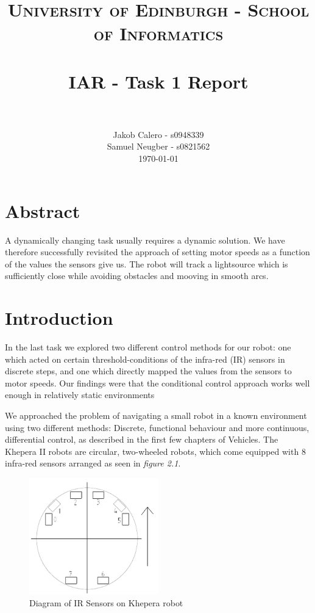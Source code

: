 \documentclass[paper=a4, fontsize=12pt]{scrartcl}	%
\title{
\vspace{-1in} 	
\usefont{OT1}{bch}{b}{n}
\normalfont \normalsize \textsc{University of Edinburgh - School of Informatics}
\\ [25pt]
\horrule{0.5pt} \\[0.4cm]
\large IAR - Task 1 Report \\
\horrule{1pt} \\[0.5cm]
}
\author{
  \normalfont \normalsize
  Jakob Calero - s0948339\\[-3pt]\normalsize
  Samuel Neugber - s0821562\\[-3pt]\normalsize
  \today
}
\date{}
\numberwithin{equation}{section}		%
\numberwithin{figure}{section}			%
\numberwithin{table}{section}				%
\begin{document}
\maketitle					%
\section{Abstract}
A dynamically changing task usually requires a dynamic solution. We have therefore successfully revisited the approach of setting motor speeds as a function of the values the sensors give us. The robot will track a lightsource which is sufficiently close while avoiding obstacles and mooving in smooth arcs.


\section{Introduction}
In the last task we explored two different control methods for our robot: one which acted on certain threshold-conditions of the infra-red (IR) sensors in discrete steps, and one which directly mapped the values from the sensors to motor speeds. Our findings were that the conditional control approach works well enough in relatively static environments

We approached the problem of navigating a small robot in a known environment
using two different methods: Discrete, functional behaviour and more continuous,
differential control, as described in the first few chapters of
Vehicles\cite{vehicles}. The Khepera II robots are circular, two-wheeled robots,
which come equipped with 8 infra-red sensors arranged as seen in \emph{figure
2.1}. 
\begin{figure}[!ht]
 \centering
  \includegraphics[width=0.5\textwidth]{IRSensors}
  \caption{Diagram of IR Sensors on Khepera robot}
\end{figure}
\end{document}
